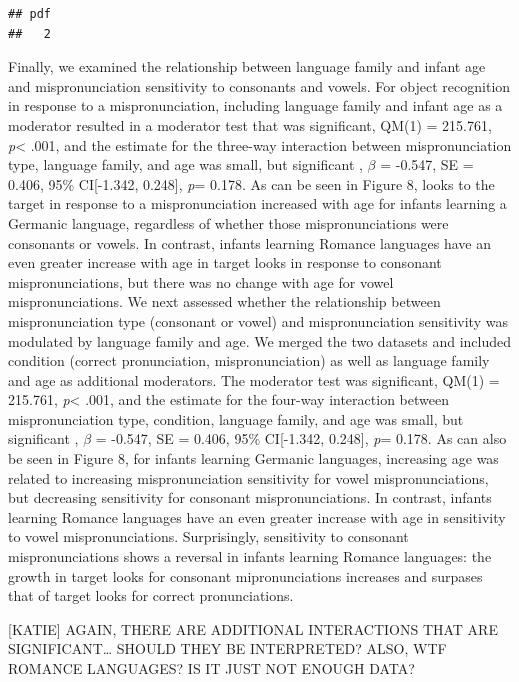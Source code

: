 \documentclass[man]{apa6}
\theoremstyle{definition}
\theoremstyle{definition}
\theoremstyle{definition}
\theoremstyle{remark}
\begin{document}
\begin{verbatim}
## pdf 
##   2
\end{verbatim}

Finally, we examined the relationship between language family and infant
age and mispronunciation sensitivity to consonants and vowels. For
object recognition in response to a mispronunciation, including language
family and infant age as a moderator resulted in a moderator test that
was significant, QM(1) = 215.761, \emph{p}\textless{} .001, and the
estimate for the three-way interaction between mispronunciation type,
language family, and age was small, but significant , \(\beta\) =
-0.547, SE = 0.406, 95\% CI{[}-1.342, 0.248{]}, \emph{p}= 0.178. As can
be seen in Figure 8, looks to the target in response to a
mispronunciation increased with age for infants learning a Germanic
language, regardless of whether those mispronunciations were consonants
or vowels. In contrast, infants learning Romance languages have an even
greater increase with age in target looks in response to consonant
mispronunciations, but there was no change with age for vowel
mispronunciations. We next assessed whether the relationship between
mispronunciation type (consonant or vowel) and mispronunciation
sensitivity was modulated by language family and age. We merged the two
datasets and included condition (correct pronunciation,
mispronunciation) as well as language family and age as additional
moderators. The moderator test was significant, QM(1) = 215.761,
\emph{p}\textless{} .001, and the estimate for the four-way interaction
between mispronunciation type, condition, language family, and age was
small, but significant , \(\beta\) = -0.547, SE = 0.406, 95\%
CI{[}-1.342, 0.248{]}, \emph{p}= 0.178. As can also be seen in Figure 8,
for infants learning Germanic languages, increasing age was related to
increasing mispronunciation sensitivity for vowel mispronunciations, but
decreasing sensitivity for consonant mispronunciations. In contrast,
infants learning Romance languages have an even greater increase with
age in sensitivity to vowel mispronunciations. Surprisingly, sensitivity
to consonant mispronunciations shows a reversal in infants learning
Romance languages: the growth in target looks for consonant
mipronunciations increases and surpases that of target looks for correct
pronunciations.

{[}KATIE{]} AGAIN, THERE ARE ADDITIONAL INTERACTIONS THAT ARE
SIGNIFICANT\ldots{} SHOULD THEY BE INTERPRETED? ALSO, WTF ROMANCE
LANGUAGES? IS IT JUST NOT ENOUGH DATA?
\end{document}

